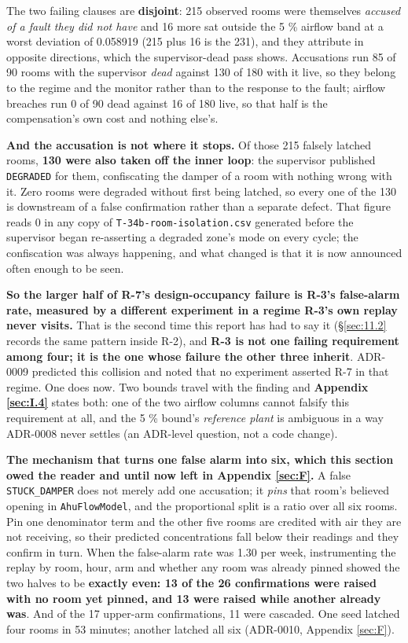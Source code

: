 The two failing clauses are \textbf{disjoint}: 215 observed rooms were themselves \emph{accused of a
fault they did not have} and 16 more sat outside the 5 \% airflow band at a worst deviation of
0.058919 (215 plus 16 is the 231), and they attribute in opposite directions, which the
supervisor-dead pass shows. Accusations run 85 of 90 rooms with the supervisor \emph{dead} against
130 of 180 with it live, so they belong to the regime and the monitor rather than to the response to
the fault; airflow breaches run 0 of 90 dead against 16 of 180 live, so that half is the
compensation's own cost and nothing else's.

\textbf{And the accusation is not where it stops.} Of those 215 falsely latched rooms,
\textbf{130 were also taken off the inner loop}: the supervisor published \texttt{DEGRADED} for
them, confiscating the damper of a room with nothing wrong with it. Zero rooms were degraded without
first being latched, so every one of the 130 is downstream of a false confirmation rather than a
separate defect. That figure reads 0 in any copy of \texttt{T-34b-room-isolation.csv} generated
before the supervisor began re-asserting a degraded zone's mode on every cycle; the confiscation was
always happening, and what changed is that it is now announced often enough to be seen.

\textbf{So the larger half of R-7's design-occupancy failure is R-3's false-alarm rate, measured by a
different experiment in a regime R-3's own replay never visits.} That is the second time this report
has had to say it (§\ref{sec:11.2} records the same pattern inside R-2), and \textbf{R-3 is not one failing
requirement among four; it is the one whose failure the other three inherit}. ADR-0009 predicted this
collision and noted that no experiment asserted R-7 in that regime. One does now. Two bounds travel
with the finding and \textbf{Appendix \ref{sec:I.4}} states both: one of the two airflow columns cannot falsify
this requirement at all, and the 5 \% bound's \emph{reference plant} is ambiguous in a way ADR-0008
never settles (an ADR-level question, not a code change).

\textbf{The mechanism that turns one false alarm into six, which this section owed the reader and
until now left in Appendix \ref{sec:F}.} A false \texttt{STUCK\_DAMPER} does not merely add one accusation;
it \emph{pins} that room's believed opening in \texttt{AhuFlowModel}, and the proportional split is
a ratio over all six rooms. Pin one denominator term and the other five rooms are credited with air
they are not receiving, so their predicted concentrations fall below their readings and they confirm
in turn. When the false-alarm rate was 1.30 per week, instrumenting the replay by room, hour, arm
and whether any room was already pinned showed the two halves to be \textbf{exactly even: 13 of the
26 confirmations were raised with no room yet pinned, and 13 were raised while another already
was}. And of the 17 upper-arm confirmations, 11 were cascaded. One seed latched four rooms in
53 minutes; another latched all six (ADR-0010, Appendix \ref{sec:F}).

